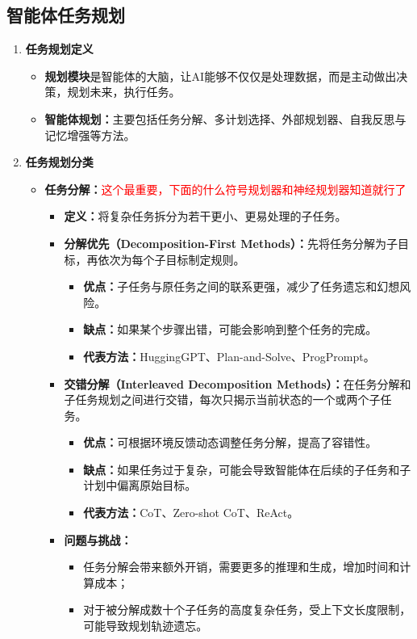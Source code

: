\documentclass[../main.tex]{subfiles}
\begin{document}
\subsection{智能体任务规划}\label{sec:agent-task-planning}
\begin{enumerate}
    \item \textbf{任务规划定义}
    \begin{itemize}
        \item \textbf{规划模块}是智能体的大脑，让AI能够不仅仅是处理数据，而是主动做出决策，规划未来，执行任务。
        \item \textbf{智能体规划：}主要包括任务分解、多计划选择、外部规划器、自我反思与记忆增强等方法。
    \end{itemize}
    \item \textbf{任务规划分类}
      \begin{itemize}
            \item \textbf{任务分解：}\textcolor{red}{这个最重要，下面的什么符号规划器和神经规划器知道就行了}
            \begin{itemize}
                \item \textbf{定义：}将复杂任务拆分为若干更小、更易处理的子任务。
                \item \textbf{分解优先（Decomposition-First Methods）：}先将任务分解为子目标，再依次为每个子目标制定规则。
                \begin{itemize}
                    \item \textbf{优点：}子任务与原任务之间的联系更强，减少了任务遗忘和幻想风险。
                    \item \textbf{缺点：}如果某个步骤出错，可能会影响到整个任务的完成。
                    \item \textbf{代表方法：}HuggingGPT、Plan-and-Solve、ProgPrompt。
                \end{itemize}
                \item \textbf{交错分解（Interleaved Decomposition Methods）：}在任务分解和子任务规划之间进行交错，每次只揭示当前状态的一个或两个子任务。
                \begin{itemize}
                    \item \textbf{优点：}可根据环境反馈动态调整任务分解，提高了容错性。
                    \item \textbf{缺点：}如果任务过于复杂，可能会导致智能体在后续的子任务和子计划中偏离原始目标。
                    \item \textbf{代表方法：}CoT、Zero-shot CoT、ReAct。
                \end{itemize}
                \item \textbf{问题与挑战：}
                \begin{itemize}
                    \item 任务分解会带来额外开销，需要更多的推理和生成，增加时间和计算成本；
                    \item 对于被分解成数十个子任务的高度复杂任务，受上下文长度限制，可能导致规划轨迹遗忘。
                \end{itemize}
            \end{itemize}


\end{itemize}
\end{enumerate}
\end{document}
